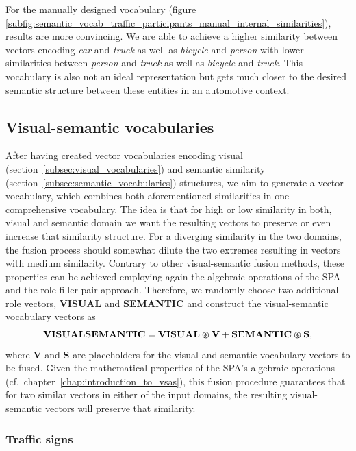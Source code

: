 For the manually designed vocabulary (figure \ref{subfig:semantic_vocab_traffic_participants_manual_internal_similarities}), results are more convincing.
We are able to achieve a higher similarity between vectors encoding \emph{car} and \emph{truck} as well as \emph{bicycle} and \emph{person} with lower similarities between \emph{person} and \emph{truck} as well as \emph{bicycle} and \emph{truck}.
This vocabulary is also not an ideal representation but gets much closer to the desired semantic structure between these entities in an automotive context. 

\subsection{Visual-semantic vocabularies}%
\label{subsec:visual_semantic_vocabularies}
 
After having created vector vocabularies encoding visual (section~\ref{subsec:visual_vocabularies}) and semantic similarity (section~\ref{subsec:semantic_vocabularies}) structures, we aim to generate a vector vocabulary, which combines both aforementioned similarities in one comprehensive vocabulary.
The idea is that for high or low similarity in both, visual and semantic domain we want the resulting vectors to preserve or even increase that similarity structure.
For a diverging similarity in the two domains, the fusion process should somewhat dilute the two extremes resulting in vectors with medium similarity.
Contrary to other visual-semantic fusion methods, these properties can be achieved employing again the algebraic operations of the \ac{SPA} and the role-filler-pair approach.
Therefore, we randomly choose two additional role vectors, \textbf{VISUAL} and \textbf{SEMANTIC} and construct the visual-semantic vocabulary vectors as
\begin{equation}
\label{eq:visual_semantic_vocab}
\mathbf{VISUALSEMANTIC} = \mathbf{VISUAL} \varoast \mathbf{V} + \mathbf{SEMANTIC} \varoast \mathbf{S},
\end{equation}
where \textbf{V} and \textbf{S} are placeholders for the visual and semantic vocabulary vectors to be fused.
Given the mathematical properties of the \ac{SPA}'s algebraic operations (cf.\ chapter~\ref{chap:introduction_to_vsas}), this fusion procedure guarantees that for two similar vectors in either of the input domains, the resulting visual-semantic vectors will preserve that similarity.

\subsubsection{Traffic signs}%
\label{ssubsec:traffic_signs}

